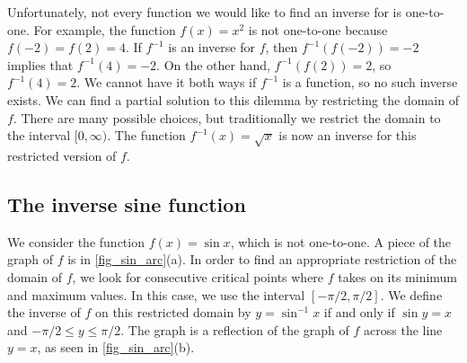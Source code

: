 Unfortunately, not every function we would like to find an inverse for is one-to-one. For example, the function $f(x)=x^2$ is not one-to-one because $f(-2)=f(2)=4$. If $f^{-1}$ is an inverse for $f$, then $f^{-1}(f(-2))=-2$ implies that $f^{-1}(4)=-2$. On the other hand, $f^{-1}(f(2))=2$, so $f^{-1}(4)=2$. We cannot have it both ways if $f^{-1}$ is a function, so no such inverse exists. We can find a partial solution to this dilemma by restricting the domain of $f$. There are many possible choices, but traditionally we restrict the domain to the interval $[0,\infty)$. The function $f^{-1}(x)=\sqrt x$ is now an inverse for this restricted version of $f$.


\subsection{The inverse sine function}

We consider the function $f(x)=\sin x$, which is not one-to-one. A piece of the graph of $f$ is in \autoref{fig_sin_arc}(a). In order to find an appropriate restriction of the domain of $f$, we look for consecutive critical points where $f$ takes on its minimum and maximum values. In this case, we use the interval $[-\pi/2,\pi/2]$. We define the inverse of $f$ on this restricted domain by $y=\sin^{-1}x$ if and only if $\sin y=x$ and $-\pi/2\leq y\leq \pi/2$. The graph is a reflection of the graph of $f$ across the line $y=x$, as seen in \autoref{fig_sin_arc}(b).

